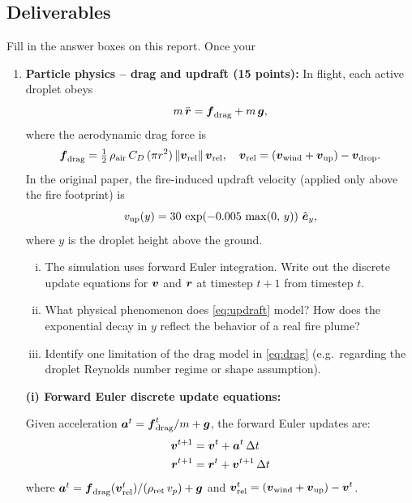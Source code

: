 \documentclass{article}
\begin{document}
\subsection*{Deliverables}
Fill in the answer boxes on this report. Once your 
\begin{enumerate}


\item[1.] \textbf{Particle physics -- drag and updraft (15 points):}
In flight, each active droplet obeys
\begin{equation}
    m\,\ddot{\mbox{\boldmath $r$}} = \mbox{\boldmath $f$}_\text{drag} + m\,\mbox{\boldmath $g$},
    \label{eq:eom}
\end{equation}
where the aerodynamic drag force is
\begin{equation}
    \mbox{\boldmath $f$}_\text{drag} = \tfrac{1}{2}\,\rho_\text{air}\,C_D\,(\pi r^2)\,\|\mbox{\boldmath $v$}_\text{rel}\|\,\mbox{\boldmath $v$}_\text{rel},
    \quad \mbox{\boldmath $v$}_\text{rel} = (\mbox{\boldmath $v$}_\text{wind} + \mbox{\boldmath $v$}_\text{up}) - \mbox{\boldmath $v$}_\text{drop}.
    \label{eq:drag}
\end{equation}
In the original paper, the fire-induced updraft velocity (applied only above the fire footprint) is
\begin{equation}
    v_\text{up}(y) = 30\,\exp\!\left(-0.005\,\max(0,\,y)\right)\,\hat{\mbox{\boldmath $e$}}_y,
    \label{eq:updraft}
\end{equation}
where $y$ is the droplet height above the ground.

\begin{enumerate}[(i)]
    \item The simulation uses forward Euler integration. Write out the discrete update equations for $\mbox{\boldmath $v$}$ and $\mbox{\boldmath $r$}$ at timestep $t+1$ from timestep $t$.
    \item What physical phenomenon does \cref{eq:updraft} model? How does the exponential decay in $y$ reflect the behavior of a real fire plume?
    \item Identify one limitation of the drag model in \cref{eq:drag} (e.g.\ regarding the droplet Reynolds number regime or shape assumption).
\end{enumerate}

\begin{answer}

\textbf{(i) Forward Euler discrete update equations:}

Given acceleration $\mbox{\boldmath $a$}^t = \mbox{\boldmath $f$}_\text{drag}^t / m + \mbox{\boldmath $g$}$, the forward Euler updates are:
\begin{align*}
    \mbox{\boldmath $v$}^{t+1} &= \mbox{\boldmath $v$}^t + \mbox{\boldmath $a$}^t \,\Delta t \\
    \mbox{\boldmath $r$}^{t+1} &= \mbox{\boldmath $r$}^t + \mbox{\boldmath $v$}^{t+1} \,\Delta t
\end{align*}
where $\mbox{\boldmath $a$}^t = \mbox{\boldmath $f$}_\text{drag}(\mbox{\boldmath $v$}_\text{rel}^t)/(\rho_\text{ret}\,v_p) + \mbox{\boldmath $g$}$ and $\mbox{\boldmath $v$}_\text{rel}^t = (\mbox{\boldmath $v$}_\text{wind} + \mbox{\boldmath $v$}_\text{up}) - \mbox{\boldmath $v$}^t$.


\end{answer}
\end{enumerate}
\end{document}
